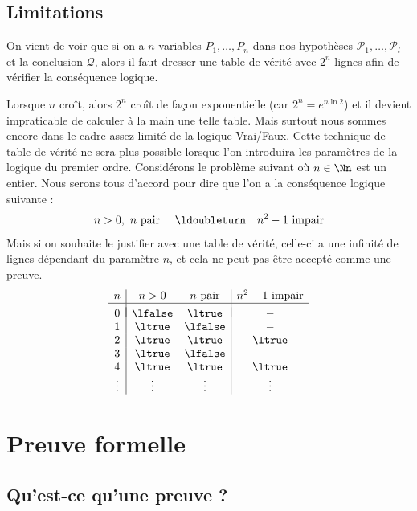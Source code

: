 \documentclass[11pt,class=report,crop=false]{standalone}
\begin{document}
\subsection{Limitations}

On vient de voir que si on a $n$ variables $P_1,\ldots,P_n$ dans nos hypothèses $\mathcal{P}_1,\ldots,\mathcal{P}_l$ et la conclusion $\mathcal{Q}$, alors il faut dresser une table de vérité avec $2^n$ lignes afin de vérifier la conséquence logique.

Lorsque $n$ croît, alors $2^n$ croît de façon exponentielle (car $2^n = e^{n\ln 2}$) et il devient impraticable de calculer à la main une telle table.
Mais surtout nous sommes encore dans le cadre assez limité de la logique Vrai/Faux. Cette technique de table de vérité ne sera plus possible lorsque l'on introduira les paramètres de la logique du premier ordre.
Considérons le problème suivant où $n \in \Nn$ est un entier. Nous serons tous d'accord pour dire que l'on a la conséquence logique suivante :
\[
n >0 , \  n \text{ pair } \quad \ldoubleturn \quad n^2-1 \text{ impair}
\]
Mais si on souhaite le justifier avec une table de vérité, celle-ci a une infinité de lignes dépendant du paramètre $n$, et cela ne peut pas être accepté comme une preuve.
	\[
\begin{array}{c | c c | c}
	n		& n>0 		& n \text{ pair} & n^2-1 \text{ impair} \\
	\hline
	&&&	\\[-2ex]
	0 		& \lfalse 	& \ltrue 		& - \\
	1 		& \ltrue 	& \lfalse 		& - \\	
	2 		& \ltrue 	& \ltrue 		& \ltrue \\
	3 		& \ltrue 	& \lfalse 		& - \\	
	4 		& \ltrue 	& \ltrue 		& \ltrue \\	
	\vdots	& \vdots	&  \vdots		& \vdots \\			
\end{array}
\]

\section{Preuve formelle}

\subsection{Qu'est-ce qu'une preuve ?}
\end{document}
